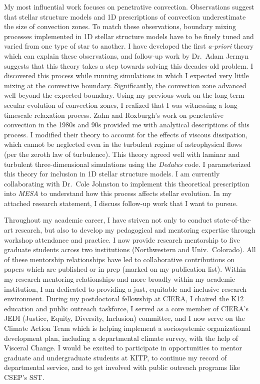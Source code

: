 \documentclass[12pt]{letter}
\begin{document}
\begin{letter}
    My most influential work focuses on penetrative convection.
    Observations suggest that stellar structure models and 1D prescriptions of convection underestimate the size of convection zones.
    To match these observations, boundary mixing processes implemented in 1D stellar structure models have to be finely tuned and varied from one type of star to another.
    I have developed the first \emph{a-priori} theory which can explain these observations, and follow-up work by Dr.~Adam Jermyn suggests that this theory takes a step towards solving this decades-old problem.
    I discovered this process while running simulations in which I expected very little mixing at the convective boundary.
    Significantly, the convection zone advanced well beyond the expected boundary.
    Using my previous work on the long-term secular evolution of convection zones, I realized that I was witnessing a long-timescale relaxation process.
    Zahn and Roxburgh's work on penetrative convection in the 1980s and 90s provided me with analytical descriptions of this process.
    I modified their theory to account for the effects of viscous dissipation, which cannot be neglected even in the turbulent regime of astrophysical flows (per the zeroth law of turbulence).
    This theory agreed well with laminar and turbulent three-dimensional simulations using the \emph{Dedalus} code.
    I parameterized this theory for inclusion in 1D stellar structure models.
    I am currently collaborating with Dr.~Cole Johnston to implement this theoretical prescription into \emph{MESA} to understand how this process affects stellar evolution.
    In my attached research statement, I discuss follow-up work that I want to pursue.

    Throughout my academic career, I have striven not only to conduct state-of-the-art research, but also to develop my pedagogical and mentoring expertise through workshop attendance and practice.
    I now provide research mentorship to five graduate students across two institutions (Northwestern and Univ.~Colorado).
    All of these mentorship relationships have led to collaborative contributions on papers which are published or in prep (marked on my publication list).
    Within my research mentoring relationships and more broadly within my academic institution, I am dedicated to providing a just, equitable and inclusive research environment.
    During my postdoctoral fellowship at CIERA, I chaired the K12 education and public outreach taskforce, I served as a core member of CIERA's JEDI (Justice, Equity, Diversity, Inclusion) committee, and I now serve on the Climate Action Team which is helping implement a sociosystemic organizational development plan, including a departmental climate survey, with the help of Visceral Change.
    I would be excited to participate in opportunities to mentor graduate and undergraduate students at KITP, to continue my record of departmental service, and to get involved with public outreach programs like CSEP's SST.


\end{letter}
\end{document}
